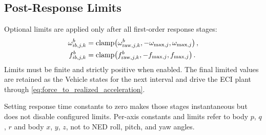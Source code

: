 \subsection{Post-Response Limits}

Optional limits are applied only after all first-order response stages:
\begin{align}
\omega_{ib,j,k}^{b}
&=
\operatorname{clamp}\!\left(
\omega_{\mathrm{raw},j,k}^{b},
-\omega_{\max,j},
\omega_{\max,j}
\right),
\label{eq:rate_limit}\\
f_{ib,j,k}^{b}
&=
\operatorname{clamp}\!\left(
f_{\mathrm{raw},j,k}^{b},
-f_{\max,j},
f_{\max,j}
\right).
\label{eq:force_limit}
\end{align}
Limits must be finite and strictly positive when enabled. The final limited
values are retained as the Vehicle states for the next interval and drive the
ECI plant through \cref{eq:force_to_realized_acceleration}.

\begin{warningbox}
Setting response time constants to zero makes those stages instantaneous but
does not disable configured limits. Per-axis constants and limits refer to
body $p$, $q$, $r$ and body $x$, $y$, $z$, not to NED roll, pitch, and yaw
angles.
\end{warningbox}
